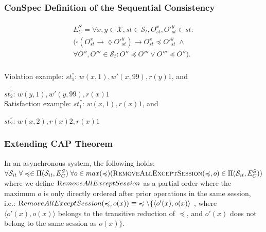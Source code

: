 \documentclass{beamer}
\begin{document}
\begin{frame}
\frametitle{ConSpec Definition of the Sequential Consistency}
\begin{align}\label{eqn:SC}
\begin{split}
E^S_C =  %
\forall x,y \in \mathcal{X}, \mathit{st} \in \mathcal{S}_t, O_\mathit{st}^x, O'^{y}_\mathit{st} \in \mathit{st}:  \\
\big( \square \left( O_\mathit{st}^x \rightarrow \lozenge O'^{y}_\mathit{st} \right)
\rightarrow O_\mathit{st}^x \preccurlyeq O'^{y}_\mathit{st}  \; \wedge
\\
\forall O'', O''' \in \mathcal{S}_t:
O'' \preccurlyeq O''' \vee O''' \preccurlyeq O'' \big). %
\end{split}
\end{align}\\

Violation example:
	$\mathit{st}_1^{''}$:   $w(x, 1), w'(x,99), r(y){1}$, and

$\mathit{st}_2^{''}$:  $w(y, 1), w'(y,99), r(x){1}$\\

Satisfaction example:
$\mathit{st}_1^{''}$:   $w(x, 1), r(x){1}$, and

$\mathit{st}_2^{''}$:  $w(x, 2), r(x){2}, r(x){1}$
\end{frame}

\begin{frame}
\frametitle{Extending CAP Theorem}
\begin{theorem}\label{thrm:capan}
	In an asynchronous system, 
	 the following holds:
	$\forall \mathcal{S}_{it} \; \forall \preccurlyeq \in \Pi(\mathcal{S}_{it},E^S_C) \; \forall o \in max(\preccurlyeq) (\textsc{RemoveAllExceptSession}(\preccurlyeq,o) \in \Pi(\mathcal{S}_{it},E^S_C) ) $
	where we define {$\textsc RemoveAllExceptSession$} as a partial order where the maximum $o$ is only directly ordered after prior operations in the same session, i.e.:
	$\noindent {\textsc RemoveAllExceptSession}(\preccurlyeq,o(x)) \equiv \; \preccurlyeq \setminus \{ \langle o'(x),o(x) \rangle$ , where $\langle o'(x),o(x) \rangle$ belongs to the transitive reduction of $\preccurlyeq$, and $o'(x)$ does not belong to the same session as $o(x)\}$.
\end{theorem}
\end{frame}
\end{document}
